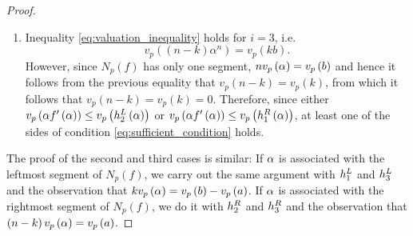 \documentclass[../main.tex]{subfiles}
\begin{document}
\begin{proof}
\begin{enumerate}
    \[
      v_p\left( \embeddedroot f'\left( \embeddedroot \right) \right) \leq v_p\left( \hR{1}\left( \embeddedroot \right) \right)
      \quad \text{and} \quad
      v_p\left( \embeddedroot f'\left( \embeddedroot \right) \right) \leq v_p\left( \hL{2}\left( \embeddedroot \right) \right)
    \]
    and hence, since either $v_p\left( k \right) = 0$ or $v_p\left( n - k \right) = 0$, at least one of the sides of condition \ref{eq:sufficient_condition} holds.
    \item Inequality \ref{eq:valuation_inequality} holds for $i = 3$, i.e. 
    \[
      v_p\left( \left( n - k \right) \alpha^n \right) = 
      v_p\left( kb \right). 
    \]
    However, since $N_p\left( f \right)$ has only one segment, $n v_p\left( \alpha \right) = v_p\left( b \right)$ and hence it follows from the previous equality that $v_p\left( n - k \right) = v_p\left( k \right)$, from which it follows that $v_p\left( n - k \right) = v_p\left( k \right) = 0$.
    Therefore, since either $v_p\left( \alpha f'\left( \alpha \right) \right) \leq v_p\left( h_{2}^L\left( \alpha \right) \right)$ or $v_p\left( \alpha f'\left( \alpha \right) \right) \leq v_p\left( h_{1}^R\left( \alpha \right) \right)$, at least one of the sides of condition \ref{eq:sufficient_condition} holds. 
  \end{enumerate}

  The proof of the second and third cases is similar:
  If $\alpha$ is associated with the leftmost segment of $N_p\left( f \right)$, we carry out the same argument with $h_{1}^L$ and $h_{3}^L$ and the observation that $k v_p\left( \alpha \right) = v_p\left( b \right) - v_p\left( a \right)$.
  If $\alpha$ is associated with the rightmost segment of $N_p\left( f \right)$, we do it with $h_{2}^R$ and $h_{3}^R$ and the observation that $\left( n - k \right)v_p\left( \alpha \right) = v_p\left( a \right)$.
\end{proof}
\end{document}
